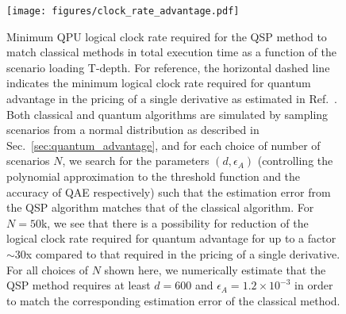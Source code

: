 \begin{enumerate}
\begin{figure}[t]
  \centering
  \texttt{[image: figures/clock\_rate\_advantage.pdf]}
  \caption{Minimum QPU logical clock rate required for the QSP \var{} method to match classical methods in total execution time as a function of the scenario loading T-depth. For reference, the horizontal dashed line indicates the minimum logical clock rate required for quantum advantage in the pricing of a single derivative as estimated in Ref.~\cite{stamatopoulos2023derivative}. Both classical and quantum algorithms are simulated by sampling scenarios from a normal distribution as described in Sec.~\ref{sec:quantum_advantage}, and for each choice of number of scenarios $N$, we search for the parameters $(d, \epsilon_A)$ (controlling the polynomial approximation to the threshold function and the accuracy of QAE respectively) such that the estimation error from the QSP algorithm matches that of the classical algorithm. For $N=50$k, we see that there is a possibility for reduction of the logical clock rate required for quantum advantage for up to a factor $\sim 30$x compared to that required in the pricing of a single derivative. For all choices of $N$ shown here, we numerically estimate that the QSP method requires at least $d=600$ and $\epsilon_A=1.2\times 10^{-3}$ in order to match the corresponding estimation error of the classical method.}
  \label{fig:clock_rate_advantage}
\end{figure}



\end{enumerate}
